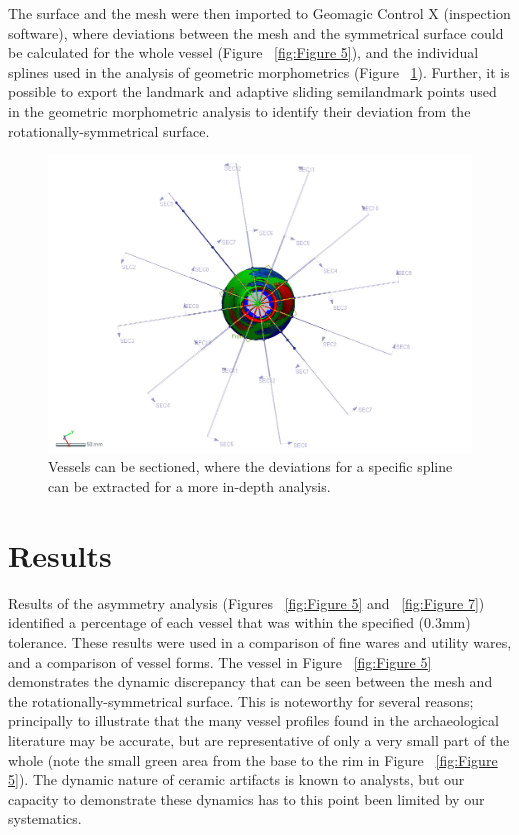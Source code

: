 \documentclass[preprint,12pt]{elsarticle}
\begin{document}
The surface and the mesh were then imported to Geomagic Control X (inspection software), where deviations between the mesh and the symmetrical surface could be calculated for the whole vessel (Figure ~\ref{fig:Figure 5}), and the individual splines used in the analysis of geometric morphometrics (Figure ~\ref{fig:Figure 6}). Further, it is possible to export the landmark and adaptive sliding semilandmark points used in the geometric morphometric analysis to identify their deviation from the rotationally-symmetrical surface.

\begin{figure}[ht]\centering
\includegraphics[width=\linewidth]{SS_2015_Figure_4}
\caption{Vessels can be sectioned, where the deviations for a specific spline can be extracted for a more in-depth analysis.}
\label{fig:Figure 6}
\end{figure}

\section{Results}

Results of the asymmetry analysis (Figures ~\ref{fig:Figure 5} and ~\ref{fig:Figure 7}) identified a percentage of each vessel that was within the specified (0.3mm) tolerance. These results were used in a comparison of fine wares and utility wares, and a comparison of vessel forms. The vessel in Figure ~\ref{fig:Figure 5} demonstrates the dynamic discrepancy that can be seen between the mesh and the rotationally-symmetrical surface. This is noteworthy for several reasons; principally to illustrate that the many vessel profiles found in the archaeological literature may be accurate, but are representative of only a very small part of the whole (note the small green area from the base to the rim in Figure ~\ref{fig:Figure 5}). The dynamic nature of ceramic artifacts is known to analysts, but our capacity to demonstrate these dynamics has to this point been limited by our systematics. 
\end{document}
